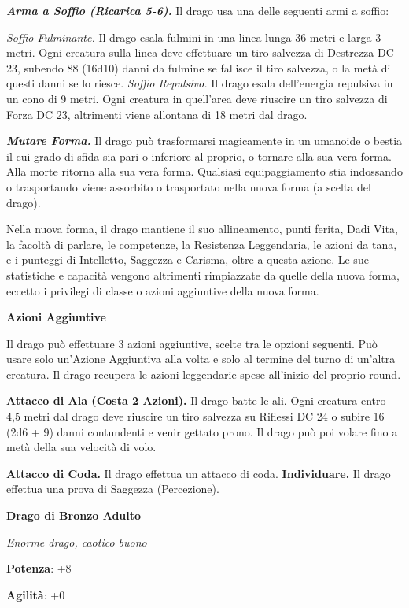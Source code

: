 \begin{multicols}{2}
\emph{\textbf{Arma a Soffio (Ricarica 5-6).}} Il drago usa una delle
seguenti armi a soffio:

\emph{Soffio Fulminante.} Il drago esala fulmini in una linea lunga 36
metri e larga 3 metri. Ogni creatura sulla linea deve effettuare un tiro
salvezza di Destrezza DC 23, subendo 88 (16d10) danni da fulmine se
fallisce il tiro salvezza, o la metà di questi danni se lo riesce.
\emph{Soffio Repulsivo.} Il drago esala dell'energia repulsiva in un
cono di 9 metri. Ogni creatura in quell'area deve riuscire un tiro
salvezza di Forza DC 23, altrimenti viene allontana di 18 metri dal
drago.

\emph{\textbf{Mutare Forma.}} Il drago può trasformarsi magicamente in
un umanoide o bestia il cui grado di sfida sia pari o inferiore al
proprio, o tornare alla sua vera forma. Alla morte ritorna alla sua vera
forma. Qualsiasi equipaggiamento stia indossando o trasportando viene
assorbito o trasportato nella nuova forma (a scelta del drago).

Nella nuova forma, il drago mantiene il suo allineamento, punti ferita,
Dadi Vita, la facoltà di parlare, le competenze, la Resistenza
Leggendaria, le azioni da tana, e i punteggi di Intelletto, Saggezza e
Carisma, oltre a questa azione. Le sue statistiche e capacità vengono
altrimenti rimpiazzate da quelle della nuova forma, eccetto i privilegi
di classe o azioni aggiuntive della nuova forma.

\textbf{Azioni Aggiuntive}

Il drago può effettuare 3 azioni aggiuntive, scelte tra le opzioni
seguenti. Può usare solo un'Azione Aggiuntiva alla volta e solo al
termine del turno di un'altra creatura. Il drago recupera le azioni
leggendarie spese all'inizio del proprio round.

\textbf{Attacco di Ala (Costa 2 Azioni).} Il drago batte le ali. Ogni
creatura entro 4,5 metri dal drago deve riuscire un tiro salvezza su Riflessi DC 24 o subire 16 (2d6 + 9) danni contundenti e venir gettato
prono. Il drago può poi volare fino a metà della sua velocità di volo.

\textbf{Attacco di Coda.} Il drago effettua un attacco di coda.
\textbf{Individuare.} Il drago effettua una prova di Saggezza
(Percezione).

\textbf{Drago di Bronzo Adulto}

\emph{Enorme drago, caotico buono}

\textbf{Potenza}: +8

\textbf{Agilità}: +0


\end{multicols}
